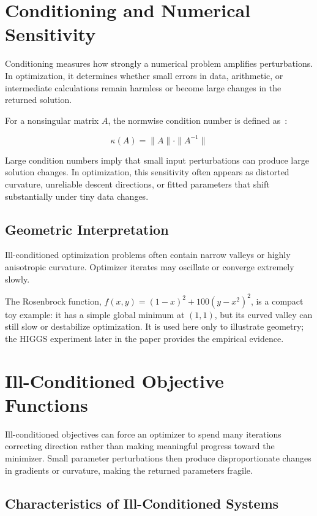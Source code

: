 \section{Conditioning and Numerical Sensitivity}

Conditioning measures how strongly a numerical problem amplifies perturbations. In optimization, it determines whether small errors in data, arithmetic, or intermediate calculations remain harmless or become large changes in the returned solution.

For a nonsingular matrix $A$, the normwise condition number is defined as~\citep{golub,trefethen}:

\begin{equation}
\kappa(A) = \|A\| \cdot \|A^{-1}\|
\end{equation}

Large condition numbers imply that small input perturbations can produce large solution changes. In optimization, this sensitivity often appears as distorted curvature, unreliable descent directions, or fitted parameters that shift substantially under tiny data changes.

\subsection{Geometric Interpretation}

Ill-conditioned optimization problems often contain narrow valleys or highly anisotropic curvature. Optimizer iterates may oscillate or converge extremely slowly.

The Rosenbrock function, $f(x,y) = (1-x)^2 + 100(y-x^2)^2$, is a compact toy example: it has a simple global minimum at $(1,1)$, but its curved valley can still slow or destabilize optimization. It is used here only to illustrate geometry; the HIGGS experiment later in the paper provides the empirical evidence.

\section{Ill-Conditioned Objective Functions}

Ill-conditioned objectives can force an optimizer to spend many iterations correcting direction rather than making meaningful progress toward the minimizer. Small parameter perturbations then produce disproportionate changes in gradients or curvature, making the returned parameters fragile.

\subsection{Characteristics of Ill-Conditioned Systems}

